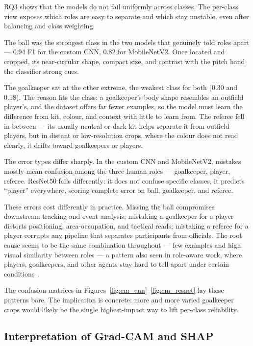 \documentclass[preprint,12pt]{elsarticle}
\begin{document}
RQ3 shows that the models do not fail uniformly across classes. The per-class view exposes which roles are easy to separate and which stay unstable, even after balancing and class weighting.

The ball was the strongest class in the two models that genuinely told roles apart --- 0.94 F1 for the custom CNN, 0.82 for MobileNetV2. Once located and cropped, its near-circular shape, compact size, and contrast with the pitch hand the classifier strong cues.

The goalkeeper sat at the other extreme, the weakest class for both (0.30 and 0.18). The reason fits the class: a goalkeeper's body shape resembles an outfield player's, and the dataset offers far fewer examples, so the model must learn the difference from kit, colour, and context with little to learn from. The referee fell in between --- its usually neutral or dark kit helps separate it from outfield players, but in distant or low-resolution crops, where the colour does not read clearly, it drifts toward goalkeepers or players.

The error types differ sharply. In the custom CNN and MobileNetV2, mistakes mostly mean confusion among the three human roles --- goalkeeper, player, referee. ResNet50 fails differently: it does not confuse specific classes, it predicts ``player'' everywhere, scoring complete error on ball, goalkeeper, and referee.

These errors cost differently in practice. Missing the ball compromises downstream tracking and event analysis; mistaking a goalkeeper for a player distorts positioning, area-occupation, and tactical reads; mistaking a referee for a player corrupts any pipeline that separates participants from officials. The root cause seems to be the same combination throughout --- few examples and high visual similarity between roles --- a pattern also seen in role-aware work, where players, goalkeepers, and other agents stay hard to tell apart under certain conditions~\cite{somers2024multitask}.

The confusion matrices in Figures~\ref{fig:cm_cnn}--\ref{fig:cm_resnet} lay these patterns bare. The implication is concrete: more and more varied goalkeeper crops would likely be the single highest-impact way to lift per-class reliability.

\subsection{Interpretation of Grad-CAM and SHAP}
\end{document}
